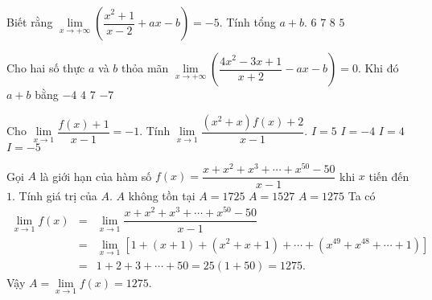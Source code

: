\begin{ex}%
	Biết rằng $\lim\limits_{x\to +\infty } \left( \dfrac {x^2+1}{x-2}+ax-b \right)=-5$. Tính tổng $a+b$.
	\choice
	{\True $6$}
	{$7$}
	{$8$}
	{$5$}
\end{ex}
\begin{ex}%
	Cho hai số thực $ a$ và $ b$ thỏa mãn $\lim\limits_{x\to +\infty} \left( \dfrac {4x^2-3x+1}{x+2}-ax-b\right)=0$. Khi đó $a+b$ bằng
	\choice
	{$-4$}
	{$4$}
	{$7$}
	{\True $-7$}
\end{ex}
\begin{ex}%
	Cho $\lim\limits_{x\to 1} \dfrac {f(x)+1}{x-1}=-1$. Tính $\lim\limits_{x\to 1} \dfrac {\left(x^2+x\right)f(x)+2}{x-1}$.
	\choice
	{$I=5$}
	{$I=-4$}
	{$I=4$}
	{\True $I=-5$}
\end{ex}
\begin{ex}%
	Gọi $A$ là giới hạn của hàm số $f(x)=\dfrac {x+x^2+x^3+\cdots +x^{50}-50}{x-1}$ khi $x$ tiến đến $1$. Tính giá trị của $A$.
	\choice
	{$A$ không tồn tại}
	{$A=1725$}
	{$A=1527$}
	{\True $A=1275$}
	\loigiai
	{Ta có \allowdisplaybreaks
		\begin{eqnarray*}
			\lim\limits_{x\to 1} f(x)&=&\lim\limits_{x\to 1} \dfrac {x+x^2+x^3+\cdots +x^{50}-50}{x-1}\\
			&=&\lim\limits_{x\to 1} \left[ 1+(x+1)+\left(x^2+x+1\right)+\cdots +\left(x^{49}+x^{48}+\cdots +1\right) \right]\\
			&=&1+2+3+\cdots +50=25(1+50)=1275.
		\end{eqnarray*}
		Vậy $A=\lim\limits_{x\to 1} f(x)=1275$.}
\end{ex}
